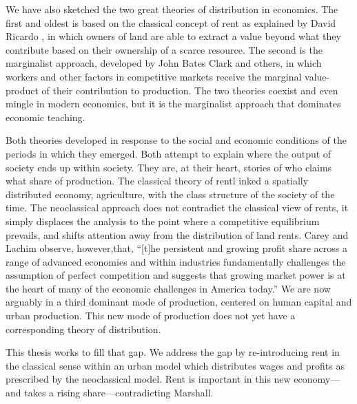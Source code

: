 We have also sketched the  two great theories of \gls{distribution} in economics. The first and oldest is based on the classical concept of rent as explained  by David Ricardo \cite{ricardoEssayInfluenceLow1815}, in which owners of land are able to extract a value beyond what they contribute based on their ownership of a scarce resource. The second is the marginalist approach, developed by John Bates Clark and others, in which workers and other factors  in competitive markets receive the \gls{marginal value-product} of their contribution to production. The two theories coexist and even mingle in modern economics, but it is the marginalist approach that dominates economic teaching. 

Both theories developed in response to the social and economic conditions of the periods in which they emerged. Both attempt to explain where the output of society ends up within society. They are, at their heart, stories of who %
claims what share of production.
The classical theory of rentl inked a spatially distributed economy, agriculture, with the class structure of the society of the time. 
The neoclassical approach does not contradict the classical view of rents, it simply displaces the analysis to the point where a competitive equilibrium prevails, and shifts attention away from the distribution of land rents.  Carey and Lachim \cite{careySomethingNothingHow2019} observe,  however,that, ``[t]he persistent and growing profit share across a range of advanced economies and within industries fundamentally challenges the assumption of perfect competition and suggests that growing market power is at the heart of many of the economic challenges in America today.'' We are now arguably in a third dominant mode of production, centered on  human capital and urban production. %
This new mode of production does not yet have a corresponding theory of distribution.

This thesis works to fill that gap. We address the gap by re-introducing rent in the classical sense within an urban model which distributes wages and profits as prescribed by  the neoclassical model. Rent is important in this new economy---and takes a rising share---contradicting Marshall. 


